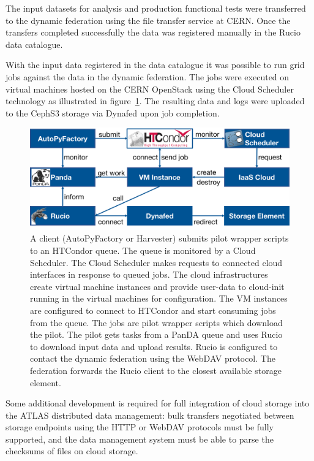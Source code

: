 \documentclass[a4paper]{jpconf}
\begin{document}
The input datasets for analysis and production functional tests were transferred to the dynamic federation using the file transfer service at CERN. Once the transfers completed successfully the data was registered manually in the Rucio data catalogue.

With the input data registered in the data catalogue it was possible to run grid jobs against the data in the dynamic federation. The jobs were executed on virtual machines hosted on the CERN OpenStack using the Cloud Scheduler technology as illustrated in figure~\ref{fig:atlas-cloud}. The resulting data and logs were uploaded to the CephS3 storage via Dynafed upon job completion.

\begin{figure}
  \includegraphics[width=\textwidth]{atlas-cloud-system.png}
  \caption{A client (AutoPyFactory or Harvester) submits pilot wrapper scripts to an HTCondor queue. The queue is monitored by a Cloud Scheduler. The Cloud Scheduler makes requests to connected cloud interfaces in response to queued jobs. The cloud infrastructures create virtual machine instances and provide user-data to cloud-init running in the virtual machines for configuration. The VM instances are configured to connect to HTCondor and start consuming jobs from the queue. The jobs are pilot wrapper scripts which download the pilot. The pilot gets tasks from a PanDA queue and uses Rucio to download input data and upload results. Rucio is configured to contact the dynamic federation using the WebDAV protocol. The federation forwards the Rucio client to the closest available storage element.}
  \label{fig:atlas-cloud}
\end{figure}

Some additional development is required for full integration of cloud storage into the ATLAS distributed data management: bulk transfers negotiated between storage endpoints using the HTTP or WebDAV protocols must be fully supported, and the data management system must be able to parse the checksums of files on cloud storage.
\end{document}
